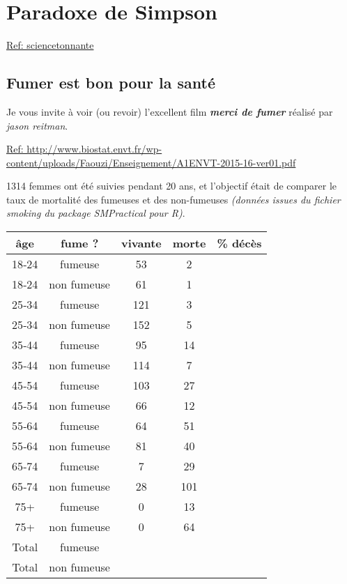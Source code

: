 \documentclass[10pt,dvipsnames, dvips, svgnames]{article}
\begin{document}
\section{Paradoxe de Simpson}


\href{https://sciencetonnante.wordpress.com/2013/04/29/le-paradoxe-de-simpson/}{Ref: sciencetonnante}


\subsection{Fumer est bon pour la santé}

Je vous invite à voir (ou revoir) l'excellent  film  \textit{\textbf{merci de fumer}}  réalisé par \textit{jason reitman}.
\medskip

\href{http://www.biostat.envt.fr/wp-content/uploads/Faouzi/Enseignement/A1ENVT-2015-16-ver01.pdf}{Ref: http://www.biostat.envt.fr/wp-content/uploads/Faouzi/Enseignement/A1ENVT-2015-16-ver01.pdf}


1314 femmes ont été suivies pendant 20 ans, et l'objectif était de comparer le taux de mortalité des fumeuses et des non-fumeuses  \textit{(données issues du fichier smoking du package SMPractical pour R)}.




\begin{center}
\begin{tabular}[]{|c |c |c |c |c |}
\hline âge & fume ? & vivante & morte &  \% décès \\
\hline \hline 18‐24 & fumeuse & 53 & 2 &  \\
\hline 18‐24 & non  fumeuse & 61 & 1 &  \\
\hline 25‐34 & fumeuse & 121 & 3 &  \\
\hline 25‐34 & non  fumeuse & 152 & 5 &  \\
\hline 35‐44 & fumeuse & 95 & 14 &  \\
\hline 35‐44 & non  fumeuse & 114 & 7 &  \\
\hline 45‐54 & fumeuse & 103 & 27 &  \\
\hline 45‐54 & non  fumeuse & 66 & 12 &  \\
\hline 55‐64 & fumeuse & 64 & 51 &  \\
\hline 55‐64 & non  fumeuse & 81 & 40 &  \\
\hline 65‐74 & fumeuse & 7 & 29 &  \\
\hline 65‐74 & non  fumeuse & 28 & 101 &  \\
\hline 75+ & fumeuse & 0 & 13 &  \\
\hline 75+ & non  fumeuse & 0 & 64 &  \\
\hline 
\hline Total & fumeuse &  &  &   \\
\hline Total & non  fumeuse &  &  &  \\
\hline 

\end{tabular} 
\end{center}
\end{document}
